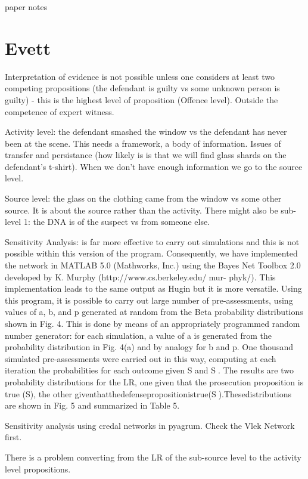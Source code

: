 paper notes

\section{Evett}

Interpretation of evidence is not possible unless one considers at least two competing propositions (the defendant is guilty vs some unknown person is guilty) - this is the highest level of proposition (Offence level). Outside the competence of expert witness. 

Activity level: the defendant smashed the window vs the defendant has never been at the scene. This needs a framework, a body of information. Issues of transfer and persistance (how likely is is that we will find glass shards on the defendant's t-shirt). When we don't have enough information we go to the source level.

Source level: the glass on the clothing came from the window vs some other source. It is about the source rather than the activity. There might also be sub-level 1: the DNA is of the suspect vs from someone else.

Sensitivity Analysis: 
is far more effective to carry out simulations and this is not possible within this version of the program. Consequently, we have implemented the network in MATLAB 5.0 (Mathworks, Inc.) using the Bayes Net Toolbox 2.0 developed by K. Murphy (http://www.cs.berkeley.edu/􏰧mur- phyk/). This implementation leads to the same output as Hugin but it is more versatile.
Using this program, it is possible to carry out large number of pre-assessments, using values of a, b, and p generated at random from the Beta probability distributions shown in Fig. 4. This is done by means of an appropriately programmed random number generator: for each simulation, a value of a is generated from the probability distribution in Fig. 4(a) and by analogy for b and p. One thousand simulated pre-assessments were carried out in this way, computing at each iteration the probabilities for each outcome given S and S􏰥. The results are two probability distributions for the LR, one given that the prosecution proposition is true (S), the other giventhatthedefensepropositionistrue(S􏰥).Thesedistributions are shown in Fig. 5 and summarized in Table 5.

Sensitivity analysis using credal networks in pyagrum. Check the Vlek Network first.

There is a problem converting from the LR of the sub-source level to the activity level propositions.

